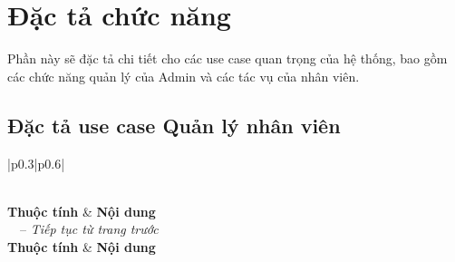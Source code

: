 \documentclass[../DoAn.tex]{subfiles}
\begin{document}
\newpage
\section{Đặc tả chức năng}
\label{section:2.3}
Phần này sẽ đặc tả chi tiết cho các use case quan trọng của hệ thống, bao gồm các chức năng quản lý của Admin và các tác vụ của nhân viên.

\subsection{Đặc tả use case Quản lý nhân viên}
\begin{longtable}{|p{}|p{}|}
    \caption{Đặc tả use case Quản lý nhân viên} \label{tab:uc_ql_nhanvien_spec} \\
    \hline
    \textbf{Thuộc tính} & \textbf{Nội dung} \\
    \hline
    \endfirsthead
    {{\tablename\ \thetable\ -- \textit{Tiếp tục từ trang trước}}} \\
    \hline
    \textbf{Thuộc tính} & \textbf{Nội dung} \\
    \hline
    \endhead
    \hline {} \\
    \endfoot
    \hline
    \endlastfoot


\end{longtable}
\end{document}

